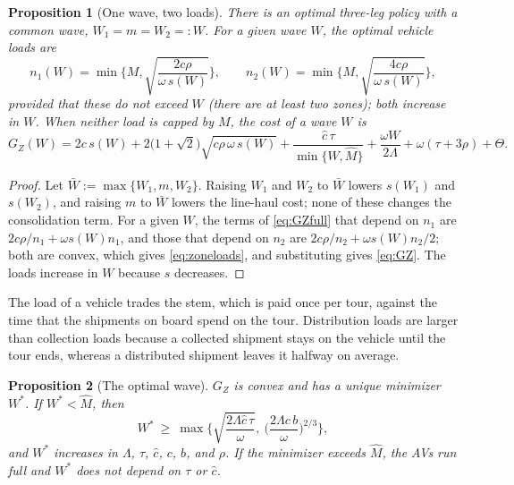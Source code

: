 \documentclass[10pt, reqno]{amsart}
\newtheorem{proposition}{Proposition}
\theoremstyle{definition}
\begin{document}
\begin{proposition}[One wave, two loads]\label{prop:wave}
There is an optimal three-leg policy with a common wave, $W_1=m=W_2=:W$. For a given wave $W$, the optimal vehicle loads are
\begin{equation}\label{eq:zoneloads}
n_1(W)=\min\Big\{M,\sqrt{\frac{2c\rho}{\omega\,s(W)}}\Big\},\qquad
n_2(W)=\min\Big\{M,\sqrt{\frac{4c\rho}{\omega\,s(W)}}\Big\},
\end{equation}
provided that these do not exceed $W$ (there are at least two zones); both increase in $W$. When neither load is capped by $M$, the cost of a wave $W$ is
\begin{equation}\label{eq:GZ}
G_Z(W)=2c\,s(W)+2\big(1+\sqrt2\big)\sqrt{c\rho\,\omega\,s(W)}+\frac{\hat c\,\tau}{\min\{W,\hat M\}}+\frac{\omega W}{2\Lambda}+\omega(\tau+3\rho)+\Theta .
\end{equation}
\end{proposition}

\begin{proof}
Let $\bar W:=\max\{W_1,m,W_2\}$. Raising $W_1$ and $W_2$ to $\bar W$ lowers $s(W_1)$ and $s(W_2)$, and raising $m$ to $\bar W$ lowers the line-haul cost; none of these changes the consolidation term. For a given $W$, the terms of \eqref{eq:GZfull} that depend on $n_1$ are $2c\rho/n_1+\omega s(W)n_1$, and those that depend on $n_2$ are $2c\rho/n_2+\omega s(W)n_2/2$; both are convex, which gives \eqref{eq:zoneloads}, and substituting gives \eqref{eq:GZ}. The loads increase in $W$ because $s$ decreases.
\end{proof}

The load of a vehicle trades the stem, which is paid once per tour, against the time that the shipments on board spend on the tour. Distribution loads are larger than collection loads because a collected shipment stays on the vehicle until the tour ends, whereas a distributed shipment leaves it halfway on average.

\begin{proposition}[The optimal wave]\label{prop:optwave}
$G_Z$ is convex and has a unique minimizer $W^*$. If $W^*<\hat M$, then
\begin{equation}\label{eq:wavebounds}
W^*\ \ge\ \max\Big\{\sqrt{\frac{2\Lambda\hat c\,\tau}{\omega}},\ \Big(\frac{2\Lambda c\,b}{\omega}\Big)^{2/3}\Big\},
\end{equation}
and $W^*$ increases in $\Lambda$, $\tau$, $\hat c$, $c$, $b$, and $\rho$. If the minimizer exceeds $\hat M$, the AVs run full and $W^*$ does not depend on $\tau$ or $\hat c$.
\end{proposition}
\end{document}
